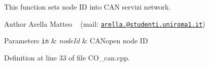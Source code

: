 This function sets node ID into C\+AN servizi network. 

\begin{DoxyAuthor}{Author}
Arella Matteo ~\newline
 (mail\+: \href{mailto:arella.1646983@studenti.uniroma1.it}{\tt arella.@studenti.\+uniroma1.\+it})
\end{DoxyAuthor}

\begin{DoxyParams}[1]{Parameters}
\mbox{\tt in}  & {\em node\+Id} & C\+A\+Nopen node ID \\
\hline
\end{DoxyParams}


Definition at line 33 of file C\+O\+\_\+can.\+cpp.


